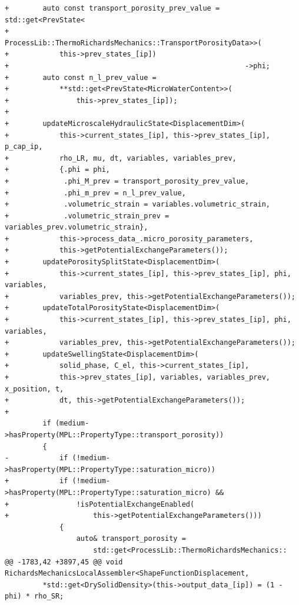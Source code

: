 \documentclass[10pt]{article}
\begin{document}
\begin{lstlisting}
+        auto const transport_porosity_prev_value = std::get<PrevState<
+            ProcessLib::ThermoRichardsMechanics::TransportPorosityData>>(
+            this->prev_states_[ip])
+                                                        ->phi;
+        auto const n_l_prev_value =
+            **std::get<PrevState<MicroWaterContent>>(
+                this->prev_states_[ip]);
+
+        updateMicroscaleHydraulicState<DisplacementDim>(
+            this->current_states_[ip], this->prev_states_[ip], p_cap_ip,
+            rho_LR, mu, dt, variables, variables_prev,
+            {.phi = phi,
+             .phi_M_prev = transport_porosity_prev_value,
+             .phi_m_prev = n_l_prev_value,
+             .volumetric_strain = variables.volumetric_strain,
+             .volumetric_strain_prev = variables_prev.volumetric_strain},
+            this->process_data_.micro_porosity_parameters,
+            this->getPotentialExchangeParameters());
+        updatePorositySplitState<DisplacementDim>(
+            this->current_states_[ip], this->prev_states_[ip], phi, variables,
+            variables_prev, this->getPotentialExchangeParameters());
+        updateTotalPorosityState<DisplacementDim>(
+            this->current_states_[ip], this->prev_states_[ip], phi, variables,
+            variables_prev, this->getPotentialExchangeParameters());
+        updateSwellingState<DisplacementDim>(
+            solid_phase, C_el, this->current_states_[ip],
+            this->prev_states_[ip], variables, variables_prev, x_position, t,
+            dt, this->getPotentialExchangeParameters());
+
         if (medium->hasProperty(MPL::PropertyType::transport_porosity))
         {
-            if (!medium->hasProperty(MPL::PropertyType::saturation_micro))
+            if (!medium->hasProperty(MPL::PropertyType::saturation_micro) &&
+                !isPotentialExchangeEnabled(
+                    this->getPotentialExchangeParameters()))
             {
                 auto& transport_porosity =
                     std::get<ProcessLib::ThermoRichardsMechanics::
@@ -1783,42 +3897,45 @@ void RichardsMechanicsLocalAssembler<ShapeFunctionDisplacement,
         *std::get<DrySolidDensity>(this->output_data_[ip]) = (1 - phi) * rho_SR;
 

\end{lstlisting}
\end{document}
